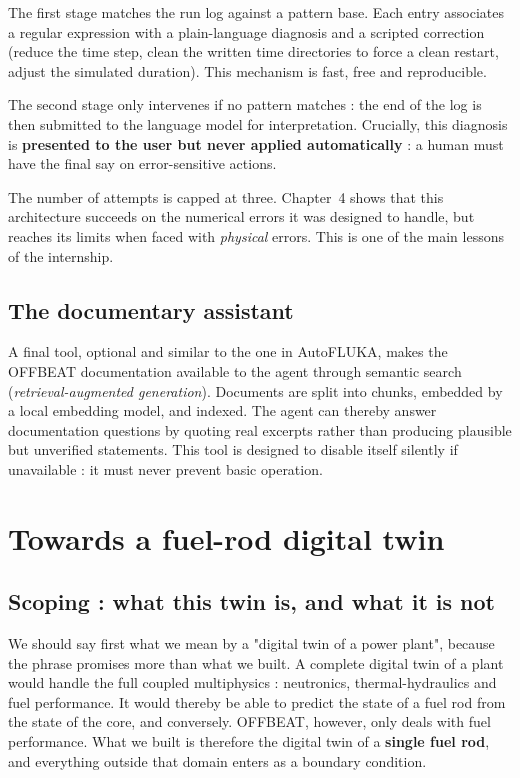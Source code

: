 \documentclass[12pt,a4paper]{report}
\begin{document}
The first stage matches the run log against a pattern base. Each entry
associates a regular expression with a plain-language diagnosis and a scripted
correction (reduce the time step, clean the written time directories to force a
clean restart, adjust the simulated duration). This mechanism is fast, free and
reproducible.

The second stage only intervenes if no pattern matches : the end of the log is
then submitted to the language model for interpretation. Crucially, this
diagnosis is \textbf{presented to the user but never applied automatically} : a
human must have the final say on error-sensitive actions.

The number of attempts is capped at three. Chapter~4 shows that this
architecture succeeds on the numerical errors it was designed to handle, but
reaches its limits when faced with \textit{physical} errors. This is one of the
main lessons of the internship.

\section{The documentary assistant}

A final tool, optional and similar to the one in AutoFLUKA, makes the OFFBEAT
documentation available to the agent through semantic search
(\textit{retrieval-augmented generation}). Documents are split into chunks,
embedded by a local embedding model, and indexed. The agent can thereby answer
documentation questions by quoting real excerpts rather than producing plausible
but unverified statements. This tool is designed to disable itself silently if
unavailable : it must never prevent basic operation.

\clearpage
\chapter{Towards a fuel-rod digital twin}

\section{Scoping : what this twin is, and what it is not}
\label{sec:cadrage}

We should say first what we mean by a "digital twin of a power plant", because
the phrase promises more than what we built. A complete digital twin of a plant
would handle the full coupled
multiphysics : neutronics, thermal-hydraulics and fuel performance. It would
thereby be able to predict the state of a fuel rod from the state of the core,
and conversely. OFFBEAT, however, only deals with fuel performance. What we built is therefore the digital twin
of a \textbf{single fuel rod}, and everything outside that domain enters as a
boundary condition.
\end{document}
